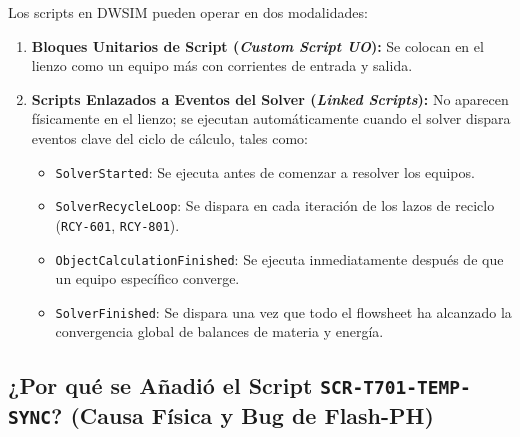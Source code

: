 \documentclass[11pt,a4paper]{article}
\begin{document}
Los scripts en DWSIM pueden operar en dos modalidades:
\begin{enumerate}
    \item \textbf{Bloques Unitarios de Script (\textit{Custom Script UO}):} Se colocan en el lienzo como un equipo más con corrientes de entrada y salida.
    \item \textbf{Scripts Enlazados a Eventos del Solver (\textit{Linked Scripts}):} No aparecen físicamente en el lienzo; se ejecutan automáticamente cuando el solver dispara eventos clave del ciclo de cálculo, tales como:
    \begin{itemize}
        \item \texttt{SolverStarted}: Se ejecuta antes de comenzar a resolver los equipos.
        \item \texttt{SolverRecycleLoop}: Se dispara en cada iteración de los lazos de reciclo (\texttt{RCY-601}, \texttt{RCY-801}).
        \item \texttt{ObjectCalculationFinished}: Se ejecuta inmediatamente después de que un equipo específico converge.
        \item \texttt{SolverFinished}: Se dispara una vez que todo el flowsheet ha alcanzado la convergencia global de balances de materia y energía.
    \end{itemize}
\end{enumerate}

\subsection{¿Por qué se Añadió el Script \texttt{SCR-T701-TEMP-SYNC}? (Causa Física y Bug de Flash-PH)}
\end{document}
